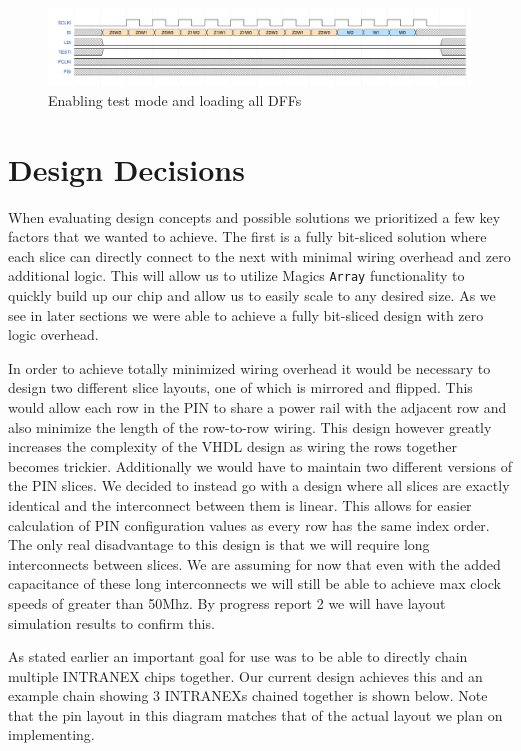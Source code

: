 \documentclass{article}
\begin{document}
\begin{figure}[H]
    \centering
    \includegraphics[width=\linewidth]{../waveforms/test.png}
    \caption{Enabling test mode and loading all DFFs}
\end{figure}

\section{Design Decisions}

When evaluating design concepts and possible solutions we prioritized a few key
factors that we wanted to achieve. The first is a fully bit-sliced solution
where each slice can directly connect to the next with minimal wiring overhead
and zero additional logic. This will allow us to utilize Magics \texttt{Array}
functionality to quickly build up our chip and allow us to easily scale to any
desired size. As we see in later sections we were able to achieve a fully
bit-sliced design with zero logic overhead.

In order to achieve totally minimized wiring overhead it would be necessary to
design two different slice layouts, one of which is mirrored and flipped. This
would allow each row in the PIN to share a power rail with the adjacent row and
also minimize the length of the row-to-row wiring. This design however greatly
increases the complexity of the VHDL design as wiring the rows together becomes
trickier. Additionally we would have to maintain two different versions of the
PIN slices. We decided to instead go with a design where all slices are exactly
identical and the interconnect between them is linear. This allows for easier
calculation of PIN configuration values as every row has the same index order.
The only real disadvantage to this design is that we will require long
interconnects between slices. We are assuming for now that even with the added
capacitance of these long interconnects we will still be able to achieve max
clock speeds of greater than 50Mhz. By progress report 2 we will have layout
simulation results to confirm this.

As stated earlier an important goal for use was to be able to directly chain
multiple INTRANEX chips together. Our current design achieves this and an
example chain showing 3 INTRANEXs chained together is shown below. Note that
the pin layout in this diagram matches that of the actual layout we plan on
implementing.
\end{document}
